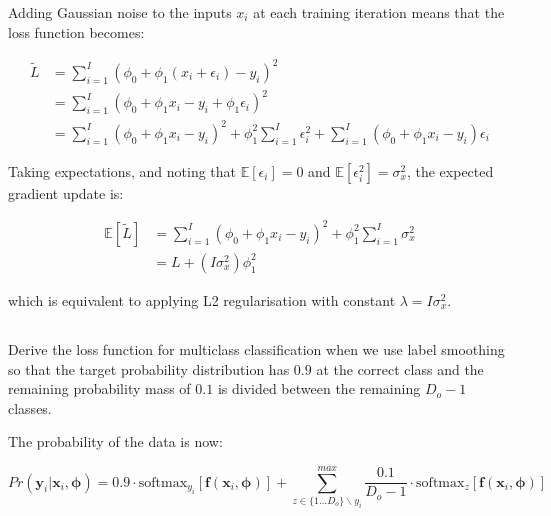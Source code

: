 \documentclass[12pt]{report}
\begin{document}
Adding Gaussian noise to the inputs $x_{i}$ at each training iteration means that the loss function becomes:

\begin{align*}
    \tilde{L} & = \sum_{i=1}^{I}(\phi_{0} + \phi_{1}(x_{i} + \epsilon_{i}) - y_{i})^{2}                                                                                            \\
              & = \sum_{i=1}^{I}(\phi_{0} + \phi_{1}x_{i} - y_{i} + \phi_{1}\epsilon_{i} )^{2}                                                                                     \\
              & = \sum_{i=1}^{I}(\phi_{0} + \phi_{1}x_{i} - y_{i})^{2} + \phi_{1}^{2}\sum_{i=1}^{I}\epsilon_{i}^{2} + \sum_{i=1}^{I}(\phi_{0} + \phi_{1}x_{i} - y_{i})\epsilon_{i}
\end{align*}

Taking expectations, and noting that $\mathbb{E}[\epsilon_{i}] = 0$ and $\mathbb{E}[\epsilon_{i}^{2}] = \sigma_{x}^{2}$, the expected gradient update is:

\begin{align*}
    \mathbb{E}[\tilde{L}] & = \sum_{i=1}^{I}(\phi_{0} + \phi_{1}x_{i} - y_{i})^{2}  + \phi_{1}^{2}\sum_{i=1}^{I}\sigma_{x}^{2} \\
                          & = L + (I\sigma_{x}^{2})\phi_{1}^{2}
\end{align*}

which is equivalent to applying L2 regularisation with constant $\lambda = I\sigma_{x}^{2}$.

\subsection{}
\begin{mdframed}
    Derive the loss function for multiclass classification when we use label smoothing so that the target probability distribution has $0.9$ at the correct class and the remaining probability mass of $0.1$ is divided between the remaining $D_{o} - 1$ classes.
\end{mdframed}

The probability of the data is now:

\begin{equation*}
    Pr(\mathbf{y}_{i}|\mathbf{x}_{i}, \boldsymbol{\phi}) = 0.9 \cdot \text{softmax}_{y_{i}}[\mathbf{f}(\mathbf{x}_{i}, \boldsymbol{\phi})] + \sum_{z \in \{1 \dots D_{o}\} \backslash y_{i}}^{max}\frac{0.1}{D_{o} - 1}\cdot \text{softmax}_{z}[\mathbf{f}(\mathbf{x}_{i}, \boldsymbol{\phi})]
\end{equation*}
\end{document}
